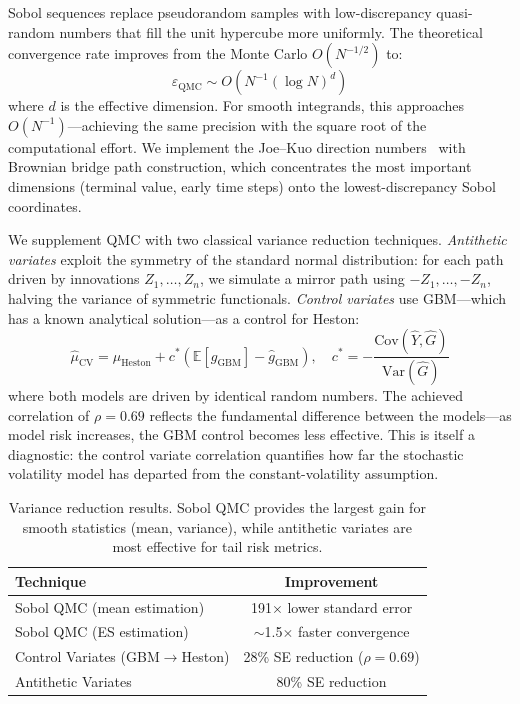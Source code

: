\documentclass[11pt,a4paper]{article}
\begin{document}
Sobol sequences replace pseudorandom samples with low-discrepancy quasi-random numbers that fill the unit hypercube more uniformly. The theoretical convergence rate improves from the Monte Carlo $O(N^{-1/2})$ to:
\begin{equation}
\varepsilon_{\text{QMC}} \sim O\!\left(N^{-1} (\log N)^d\right)
\end{equation}
where $d$ is the effective dimension. For smooth integrands, this approaches $O(N^{-1})$---achieving the same precision with the square root of the computational effort. We implement the Joe--Kuo direction numbers~\cite{joe2010} with Brownian bridge path construction, which concentrates the most important dimensions (terminal value, early time steps) onto the lowest-discrepancy Sobol coordinates.

We supplement QMC with two classical variance reduction techniques. \textit{Antithetic variates} exploit the symmetry of the standard normal distribution: for each path driven by innovations $Z_1, \ldots, Z_n$, we simulate a mirror path using $-Z_1, \ldots, -Z_n$, halving the variance of symmetric functionals. \textit{Control variates} use GBM---which has a known analytical solution---as a control for Heston:
\begin{equation}
\hat{\mu}_{\text{CV}} = \hat{\mu}_{\text{Heston}} + c^* \left( \mathbb{E}[g_{\text{GBM}}] - \hat{g}_{\text{GBM}} \right), \quad
c^* = -\frac{\text{Cov}(\hat{Y}, \hat{G})}{\text{Var}(\hat{G})}
\end{equation}
where both models are driven by identical random numbers. The achieved correlation of $\rho = 0.69$ reflects the fundamental difference between the models---as model risk increases, the GBM control becomes less effective. This is itself a diagnostic: the control variate correlation quantifies how far the stochastic volatility model has departed from the constant-volatility assumption.

\begin{table}[H]
\centering
\begin{tabular}{lc}
\toprule
\textbf{Technique} & \textbf{Improvement} \\
\midrule
Sobol QMC (mean estimation)          & 191$\times$ lower standard error \\
Sobol QMC (ES estimation)            & $\sim$1.5$\times$ faster convergence \\
Control Variates (GBM$\to$Heston)    & 28\% SE reduction ($\rho = 0.69$) \\
Antithetic Variates                  & 80\% SE reduction \\
\bottomrule
\end{tabular}
\caption{Variance reduction results. Sobol QMC provides the largest gain for smooth statistics (mean, variance), while antithetic variates are most effective for tail risk metrics.}
\label{tab:variance_reduction}
\end{table}
\end{document}
